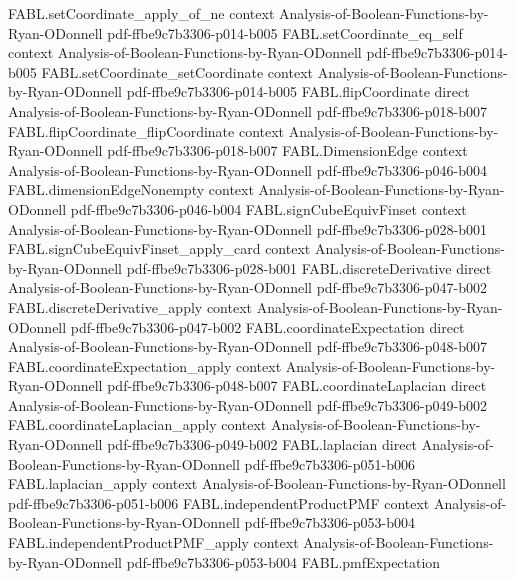 \begin{theorem}
\proofstep
  {FABL.setCoordinate_apply_of_ne}
  {context}
  {Analysis-of-Boolean-Functions-by-Ryan-ODonnell}
  {pdf-ffbe9c7b3306-p014-b005}
\proofstep
  {FABL.setCoordinate_eq_self}
  {context}
  {Analysis-of-Boolean-Functions-by-Ryan-ODonnell}
  {pdf-ffbe9c7b3306-p014-b005}
\proofstep
  {FABL.setCoordinate_setCoordinate}
  {context}
  {Analysis-of-Boolean-Functions-by-Ryan-ODonnell}
  {pdf-ffbe9c7b3306-p014-b005}
\proofstep
  {FABL.flipCoordinate}
  {direct}
  {Analysis-of-Boolean-Functions-by-Ryan-ODonnell}
  {pdf-ffbe9c7b3306-p018-b007}
\proofstep
  {FABL.flipCoordinate_flipCoordinate}
  {context}
  {Analysis-of-Boolean-Functions-by-Ryan-ODonnell}
  {pdf-ffbe9c7b3306-p018-b007}
\proofstep
  {FABL.DimensionEdge}
  {context}
  {Analysis-of-Boolean-Functions-by-Ryan-ODonnell}
  {pdf-ffbe9c7b3306-p046-b004}
\proofstep
  {FABL.dimensionEdgeNonempty}
  {context}
  {Analysis-of-Boolean-Functions-by-Ryan-ODonnell}
  {pdf-ffbe9c7b3306-p046-b004}
\proofstep
  {FABL.signCubeEquivFinset}
  {context}
  {Analysis-of-Boolean-Functions-by-Ryan-ODonnell}
  {pdf-ffbe9c7b3306-p028-b001}
\proofstep
  {FABL.signCubeEquivFinset_apply_card}
  {context}
  {Analysis-of-Boolean-Functions-by-Ryan-ODonnell}
  {pdf-ffbe9c7b3306-p028-b001}
\proofstep
  {FABL.discreteDerivative}
  {direct}
  {Analysis-of-Boolean-Functions-by-Ryan-ODonnell}
  {pdf-ffbe9c7b3306-p047-b002}
\proofstep
  {FABL.discreteDerivative_apply}
  {context}
  {Analysis-of-Boolean-Functions-by-Ryan-ODonnell}
  {pdf-ffbe9c7b3306-p047-b002}
\proofstep
  {FABL.coordinateExpectation}
  {direct}
  {Analysis-of-Boolean-Functions-by-Ryan-ODonnell}
  {pdf-ffbe9c7b3306-p048-b007}
\proofstep
  {FABL.coordinateExpectation_apply}
  {context}
  {Analysis-of-Boolean-Functions-by-Ryan-ODonnell}
  {pdf-ffbe9c7b3306-p048-b007}
\proofstep
  {FABL.coordinateLaplacian}
  {direct}
  {Analysis-of-Boolean-Functions-by-Ryan-ODonnell}
  {pdf-ffbe9c7b3306-p049-b002}
\proofstep
  {FABL.coordinateLaplacian_apply}
  {context}
  {Analysis-of-Boolean-Functions-by-Ryan-ODonnell}
  {pdf-ffbe9c7b3306-p049-b002}
\proofstep
  {FABL.laplacian}
  {direct}
  {Analysis-of-Boolean-Functions-by-Ryan-ODonnell}
  {pdf-ffbe9c7b3306-p051-b006}
\proofstep
  {FABL.laplacian_apply}
  {context}
  {Analysis-of-Boolean-Functions-by-Ryan-ODonnell}
  {pdf-ffbe9c7b3306-p051-b006}
\proofstep
  {FABL.independentProductPMF}
  {context}
  {Analysis-of-Boolean-Functions-by-Ryan-ODonnell}
  {pdf-ffbe9c7b3306-p053-b004}
\proofstep
  {FABL.independentProductPMF_apply}
  {context}
  {Analysis-of-Boolean-Functions-by-Ryan-ODonnell}
  {pdf-ffbe9c7b3306-p053-b004}
\proofstep
  {FABL.pmfExpectation}

\end{theorem}
